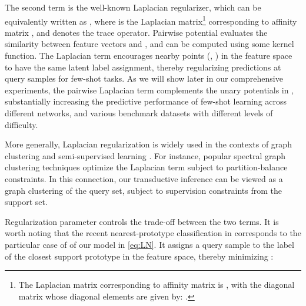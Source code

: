 \documentclass{article}
\begin{document}
The second term  is the well-known Laplacian regularizer, which can be equivalently  written as , where  is the Laplacian matrix\footnote{The Laplacian matrix corresponding 
to affinity matrix  is , with  the diagonal matrix whose diagonal elements are given by: .} 
corresponding 
to affinity matrix , and  denotes the trace operator. Pairwise potential  
evaluates the similarity between feature vectors  and , and can be computed
using some kernel function. 
The Laplacian term encourages nearby points (, ) in the feature space to have the same latent label assignment, thereby regularizing 
predictions at query samples for few-shot tasks. As we will show later in our comprehensive experiments, the pairwise Laplacian term complements the unary potentials in , substantially increasing the predictive performance of few-shot learning across different networks, and various benchmark datasets with different levels of difficulty. 

More generally, Laplacian regularization is widely used in the contexts of graph clustering \cite{VonLuxburg2007,ShiMalik2000,ziko2018scalable,WangCarreira-Perpinan2014} and semi-supervised learning \cite{weston2012deep, belkin2006manifold}. For instance, popular spectral graph clustering techniques \cite{VonLuxburg2007,ShiMalik2000} optimize the Laplacian term subject to partition-balance constraints. In this connection, our transductive inference can be viewed as a graph clustering of the query set, subject to supervision constraints from the support set. 

Regularization parameter  controls the trade-off between the two terms. It is worth noting that the recent nearest-prototype classification in \cite{wang2019simpleshot} corresponds to the particular case of  of our model in \eqref{eq:LN}. It assigns a query sample  to the label of the closest support prototype in the feature space, thereby minimizing :
\end{document}
